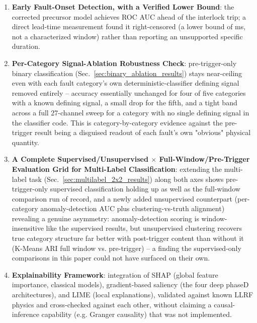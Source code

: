 \begin{enumerate}
    \item \textbf{Early Fault-Onset Detection, with a Verified Lower Bound}: the corrected precursor model achieves \MetricZeroFivePhaseZeroPrecursorRandomForestRocAuc{} ROC AUC ahead of the interlock trip; a direct lead-time measurement found it right-censored (a lower bound of \MetricZeroFivePrecursorLeadTimeLeadTimeMsLowerBoundMeanCensored{}ms, not a characterized window) rather than reporting an unsupported specific duration.

    \item \textbf{Per-Category Signal-Ablation Robustness Check}: pre-trigger-only binary classification (Sec.~\ref{sec:binary_ablation_results}) stays near-ceiling even with each fault category's own deterministic-classifier defining signal removed entirely -- accuracy essentially unchanged for four of five categories with a known defining signal, a small drop for the fifth, and a tight band across a full 27-channel sweep for a category with no single defining signal in the classifier code. This is category-by-category evidence against the pre-trigger result being a disguised readout of each fault's own "obvious" physical quantity. %

    \item \textbf{A Complete Supervised/Unsupervised $\times$ Full-Window/Pre-Trigger Evaluation Grid for Multi-Label Classification}: extending the multi-label task (Sec.~\ref{sec:multilabel_2x2_results}) along both axes shows pre-trigger-only supervised classification holding up as well as the full-window comparison run of record, and a newly added unsupervised counterpart (per-category anomaly-detection AUC plus clustering-vs-truth alignment) revealing a genuine asymmetry: anomaly-detection scoring is window-insensitive like the supervised results, but unsupervised clustering recovers true category structure far better with post-trigger content than without it (K-Means ARI \MetricZeroSevenbPhaseTwoMultilabelUnsupervisedKmeansAri{} full window vs. \MetricZeroSevenbPhaseTwoMultilabelUnsupervisedPretriggerKmeansAri{} pre-trigger) -- a finding the supervised-only comparisons in this paper could not have surfaced on their own.

    \item \textbf{Explainability Framework}: integration of SHAP (global feature importance, classical models), gradient-based saliency (the four deep phaseD architectures), and LIME (local explanations), validated against known LLRF physics and cross-checked against each other, without claiming a causal-inference capability (e.g. Granger causality) that was not implemented.


\end{enumerate}
